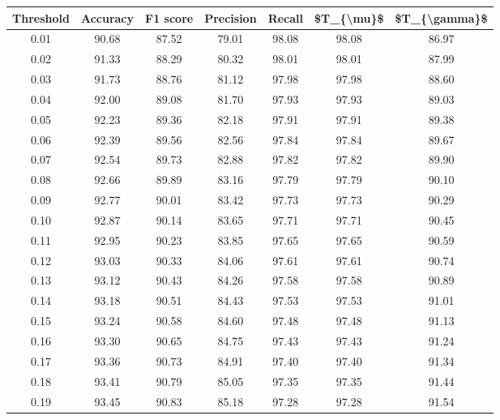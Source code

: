 \begin{tabular}{|c|c|c|c|c|c|c|}
\hline
 Threshold &  Accuracy &  F1 score &  Precision &  Recall &  \$T\_\{\textbackslash mu\}\$ &  \$T\_\{\textbackslash gamma\}\$ \\
\hline
      0.01 &     90.68 &     87.52 &      79.01 &   98.08 &      98.08 &         86.97 \\
      0.02 &     91.33 &     88.29 &      80.32 &   98.01 &      98.01 &         87.99 \\
      0.03 &     91.73 &     88.76 &      81.12 &   97.98 &      97.98 &         88.60 \\
      0.04 &     92.00 &     89.08 &      81.70 &   97.93 &      97.93 &         89.03 \\
      0.05 &     92.23 &     89.36 &      82.18 &   97.91 &      97.91 &         89.38 \\
      0.06 &     92.39 &     89.56 &      82.56 &   97.84 &      97.84 &         89.67 \\
      0.07 &     92.54 &     89.73 &      82.88 &   97.82 &      97.82 &         89.90 \\
      0.08 &     92.66 &     89.89 &      83.16 &   97.79 &      97.79 &         90.10 \\
      0.09 &     92.77 &     90.01 &      83.42 &   97.73 &      97.73 &         90.29 \\
      0.10 &     92.87 &     90.14 &      83.65 &   97.71 &      97.71 &         90.45 \\
      0.11 &     92.95 &     90.23 &      83.85 &   97.65 &      97.65 &         90.59 \\
      0.12 &     93.03 &     90.33 &      84.06 &   97.61 &      97.61 &         90.74 \\
      0.13 &     93.12 &     90.43 &      84.26 &   97.58 &      97.58 &         90.89 \\
      0.14 &     93.18 &     90.51 &      84.43 &   97.53 &      97.53 &         91.01 \\
      0.15 &     93.24 &     90.58 &      84.60 &   97.48 &      97.48 &         91.13 \\
      0.16 &     93.30 &     90.65 &      84.75 &   97.43 &      97.43 &         91.24 \\
      0.17 &     93.36 &     90.73 &      84.91 &   97.40 &      97.40 &         91.34 \\
      0.18 &     93.41 &     90.79 &      85.05 &   97.35 &      97.35 &         91.44 \\
      0.19 &     93.45 &     90.83 &      85.18 &   97.28 &      97.28 &         91.54 \\

\end{tabular}
